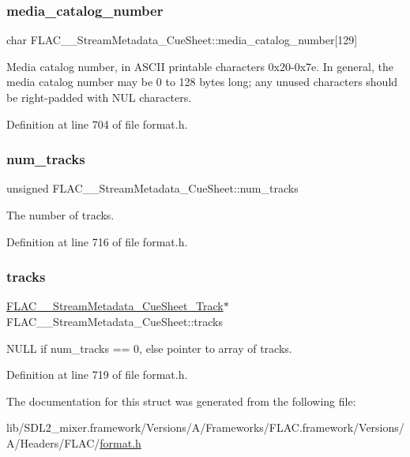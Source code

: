\subsubsection{\texorpdfstring{media\_catalog\_number}{media\_catalog\_number}}
{\footnotesize\ttfamily char F\+L\+A\+C\+\_\+\+\_\+\+Stream\+Metadata\+\_\+\+Cue\+Sheet\+::media\+\_\+catalog\+\_\+number\mbox{[}129\mbox{]}}

Media catalog number, in A\+S\+C\+II printable characters 0x20-\/0x7e. In general, the media catalog number may be 0 to 128 bytes long; any unused characters should be right-\/padded with N\+UL characters. 

Definition at line 704 of file format.\+h.

\mbox{\label{struct_f_l_a_c_____stream_metadata___cue_sheet_a6924f26a8e8fa9023f23539b959fe2ae}} 
\subsubsection{\texorpdfstring{num\_tracks}{num\_tracks}}
{\footnotesize\ttfamily unsigned F\+L\+A\+C\+\_\+\+\_\+\+Stream\+Metadata\+\_\+\+Cue\+Sheet\+::num\+\_\+tracks}

The number of tracks. 

Definition at line 716 of file format.\+h.

\mbox{\label{struct_f_l_a_c_____stream_metadata___cue_sheet_a5c0c3440b01b773684d56aeb1e424fab}} 
\subsubsection{\texorpdfstring{tracks}{tracks}}
{\footnotesize\ttfamily \mbox{\hyperlink{struct_f_l_a_c_____stream_metadata___cue_sheet___track}{F\+L\+A\+C\+\_\+\+\_\+\+Stream\+Metadata\+\_\+\+Cue\+Sheet\+\_\+\+Track}}$\ast$ F\+L\+A\+C\+\_\+\+\_\+\+Stream\+Metadata\+\_\+\+Cue\+Sheet\+::tracks}

N\+U\+LL if num\+\_\+tracks == 0, else pointer to array of tracks. 

Definition at line 719 of file format.\+h.



The documentation for this struct was generated from the following file\+:\begin{DoxyCompactItemize}
\item 
lib/\+S\+D\+L2\+\_\+mixer.\+framework/\+Versions/\+A/\+Frameworks/\+F\+L\+A\+C.\+framework/\+Versions/\+A/\+Headers/\+F\+L\+A\+C/\mbox{\hyperlink{format_8h}{format.\+h}}\end{DoxyCompactItemize}
